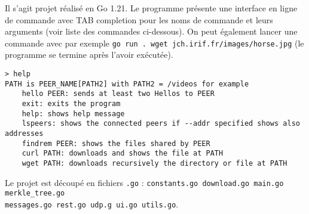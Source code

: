 Il s'agit projet réalisé en Go 1.21. Le programme présente une interface en ligne de commande avec TAB completion pour les noms de commande et leurs arguments (voir liste des commandes ci-dessous). On peut également lancer une commande avec par exemple \texttt{go run . wget jch.irif.fr/images/horse.jpg} (le programme se termine après l'avoir exécutée).

\begin{verbatim}
> help
PATH is PEER_NAME[PATH2] with PATH2 = /videos for example
    hello PEER: sends at least two Hellos to PEER
    exit: exits the program
    help: shows help message
    lspeers: shows the connected peers if --addr specified shows also addresses
    findrem PEER: shows the files shared by PEER
    curl PATH: downloads and shows the file at PATH
    wget PATH: downloads recursively the directory or file at PATH
\end{verbatim}
Le projet est découpé en fichiers \texttt{.go} : \texttt{constants.go download.go main.go merkle_tree.go}\\
\texttt{messages.go rest.go udp.g ui.go utils.go}.

